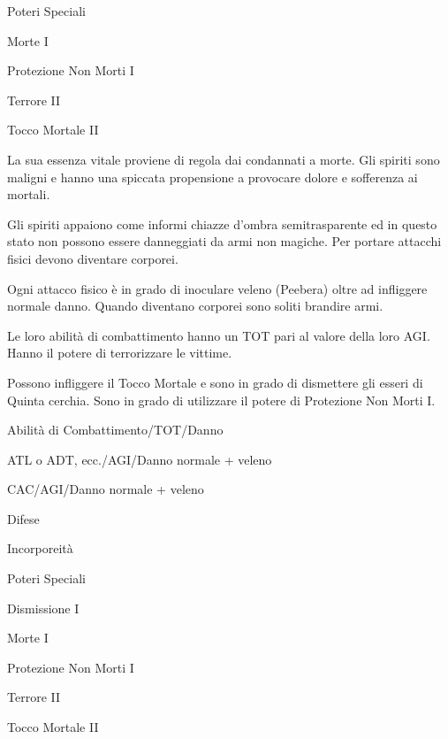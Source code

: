 \begin{parmostro}{Poteri Speciali}
\item Morte I
\item Protezione Non Morti I
\item Terrore II
\item Tocco Mortale II
\end{parmostro}


La sua essenza vitale proviene di regola dai condannati a morte. Gli
spiriti sono maligni e hanno una spiccata propensione a provocare
dolore e sofferenza ai mortali. 

Gli spiriti appaiono come informi chiazze d'ombra semitrasparente ed
in questo stato non possono essere danneggiati da armi non magiche.
Per portare attacchi fisici devono diventare corporei.

Ogni attacco fisico \`e in grado di inoculare veleno (Peebera) oltre
ad infliggere normale danno. Quando diventano corporei sono soliti
brandire armi.

Le loro abilit\`a di
combattimento hanno un TOT pari al valore della loro AGI. Hanno il
potere di terrorizzare le vittime. 

Possono infliggere il Tocco Mortale
e sono in grado di dismettere gli esseri di Quinta cerchia.  Sono in grado
di utilizzare il potere di Protezione Non Morti I. 


\begin{parmostro}{Abilit\`a di Combattimento/TOT/Danno}
\item ATL o ADT, ecc./AGI/Danno normale + veleno
\item CAC/AGI/Danno normale + veleno
\end{parmostro}

\begin{parmostro}{Difese}
\item Incorporeit\`a
\end{parmostro}

\begin{parmostro}{Poteri Speciali}
\item Dismissione I
\item Morte I
\item Protezione Non Morti I
\item Terrore II
\item Tocco Mortale II
\end{parmostro}

